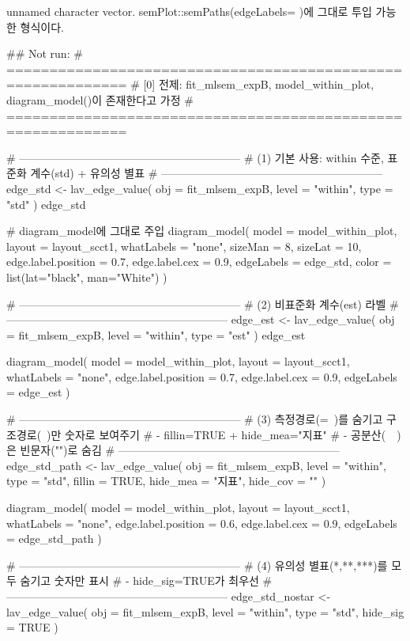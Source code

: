 \documentclass[a4paper]{book}
\begin{document}
%
\begin{Value}
unnamed character vector.
semPlot::semPaths(edgeLabels= )에 그대로 투입 가능한 형식이다.
\end{Value}
%
\begin{Examples}
\begin{ExampleCode}
\#\# Not run: 
# ============================================================
# [0] 전제: fit_mlsem_expB, model_within_plot, diagram_model()이 존재한다고 가정
# ============================================================

# ------------------------------------------------------------
# (1) 기본 사용: within 수준, 표준화 계수(std) + 유의성 별표
# ------------------------------------------------------------
edge_std <- lav_edge_value(
  obj   = fit_mlsem_expB,
  level = "within",
  type  = "std"
)
edge_std

# diagram_model에 그대로 주입
diagram_model(
  model      = model_within_plot,
  layout     = layout_scct1,
  whatLabels = "none",
  sizeMan    = 8,
  sizeLat    = 10,
  edge.label.position = 0.7,
  edge.label.cex      = 0.9,
  edgeLabels = edge_std,
  color = list(lat="black", man="White")
)

# ------------------------------------------------------------
# (2) 비표준화 계수(est) 라벨
# ------------------------------------------------------------
edge_est <- lav_edge_value(
  obj   = fit_mlsem_expB,
  level = "within",
  type  = "est"
)
edge_est

diagram_model(
  model      = model_within_plot,
  layout     = layout_scct1,
  whatLabels = "none",
  edge.label.position = 0.7,
  edge.label.cex      = 0.9,
  edgeLabels = edge_est
)

# ------------------------------------------------------------
# (3) 측정경로(=~)를 숨기고 구조경로(~)만 숫자로 보여주기
#     - fillin=TRUE + hide_mea="지표"
#     - 공분산(~~)은 빈문자("")로 숨김
# ------------------------------------------------------------
edge_std_path <- lav_edge_value(
  obj      = fit_mlsem_expB,
  level    = "within",
  type     = "std",
  fillin   = TRUE,
  hide_mea = "지표",
  hide_cov = ""
)

diagram_model(
  model      = model_within_plot,
  layout     = layout_scct1,
  whatLabels = "none",
  edge.label.position = 0.6,
  edge.label.cex      = 0.9,
  edgeLabels = edge_std_path
)

# ------------------------------------------------------------
# (4) 유의성 별표(*,**,***)를 모두 숨기고 숫자만 표시
#     - hide_sig=TRUE가 최우선
# ------------------------------------------------------------
edge_std_nostar <- lav_edge_value(
  obj      = fit_mlsem_expB,
  level    = "within",
  type     = "std",
  hide_sig = TRUE
)


\end{ExampleCode}
\end{Examples}
\end{document}
